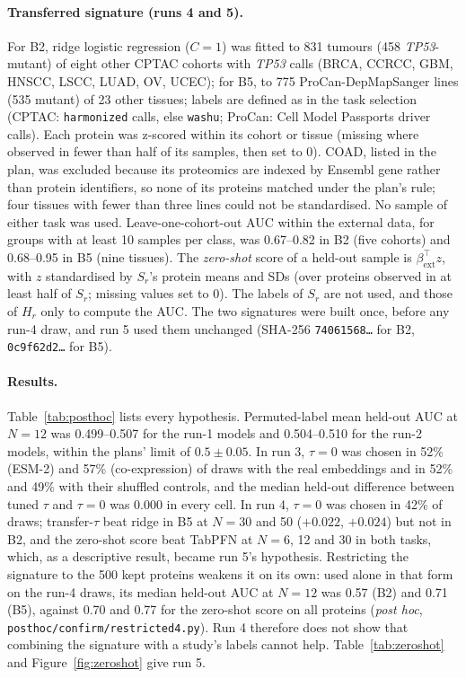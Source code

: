 \documentclass[10pt,letterpaper]{article}
\begin{document}
\paragraph{Transferred signature (runs 4 and 5).} For B2, ridge logistic regression ($C = 1$) was fitted to
831 tumours (458 \textit{TP53}-mutant) of eight other CPTAC cohorts with \textit{TP53} calls (BRCA, CCRCC,
GBM, HNSCC, LSCC, LUAD, OV, UCEC); for B5, to 775 ProCan-DepMapSanger lines (535 mutant) of 23 other tissues;
labels are defined as in the task selection (CPTAC: \texttt{harmonized} calls, else \texttt{washu}; ProCan:
Cell Model Passports driver calls). Each protein was z-scored within its cohort or tissue (missing where
observed in fewer than half of its samples, then set to 0). COAD, listed in the plan, was excluded because
its proteomics are indexed by Ensembl gene rather than protein identifiers, so none of its proteins matched
under the plan's rule; four tissues with fewer than three lines could not be standardised. No sample of
either task was used. Leave-one-cohort-out AUC within the external data, for groups with at least 10 samples
per class, was 0.67--0.82 in B2 (five cohorts) and 0.68--0.95 in B5 (nine tissues). The \emph{zero-shot}
score of a held-out sample is $\beta_\mathrm{ext}^\top z$, with $z$ standardised by $S_r$'s protein means and
SDs (over proteins observed in at least half of $S_r$; missing values set to 0). The labels of $S_r$ are not
used, and those of $H_r$ only to compute the AUC. The two signatures were built once, before any run-4 draw,
and run 5 used them unchanged (SHA-256 \texttt{74061568\ldots} for B2, \texttt{0c9f62d2\ldots} for B5).

\paragraph{Results.} Table~\ref{tab:posthoc} lists every hypothesis. Permuted-label mean held-out AUC at
$N = 12$ was 0.499--0.507 for the run-1 models and 0.504--0.510 for the run-2 models, within the plans' limit
of $0.5 \pm 0.05$. In run 3, $\tau = 0$ was chosen in 52\% (ESM-2) and 57\% (co-expression) of draws with the
real embeddings and in 52\% and 49\% with their shuffled controls, and the median held-out difference between
tuned $\tau$ and $\tau = 0$ was 0.000 in every cell. In run 4, $\tau = 0$ was chosen in 42\% of draws;
transfer-$\tau$ beat ridge in B5 at $N = 30$ and 50 ($+0.022$, $+0.024$) but not in B2, and the zero-shot
score beat TabPFN at $N = 6$, 12 and 30 in both tasks, which, as a descriptive result, became run 5's
hypothesis. Restricting the signature to the 500 kept proteins weakens it on its own: used alone in that
form on the run-4 draws, its median held-out AUC at $N = 12$ was 0.57 (B2) and 0.71 (B5), against 0.70 and
0.77 for the zero-shot score on all proteins (\emph{post hoc}, \texttt{posthoc/confirm/restricted4.py}). Run 4
therefore does not show that combining the signature with a study's labels cannot help. Table~\ref{tab:zeroshot} and Figure~\ref{fig:zeroshot} give run 5.
\end{document}
